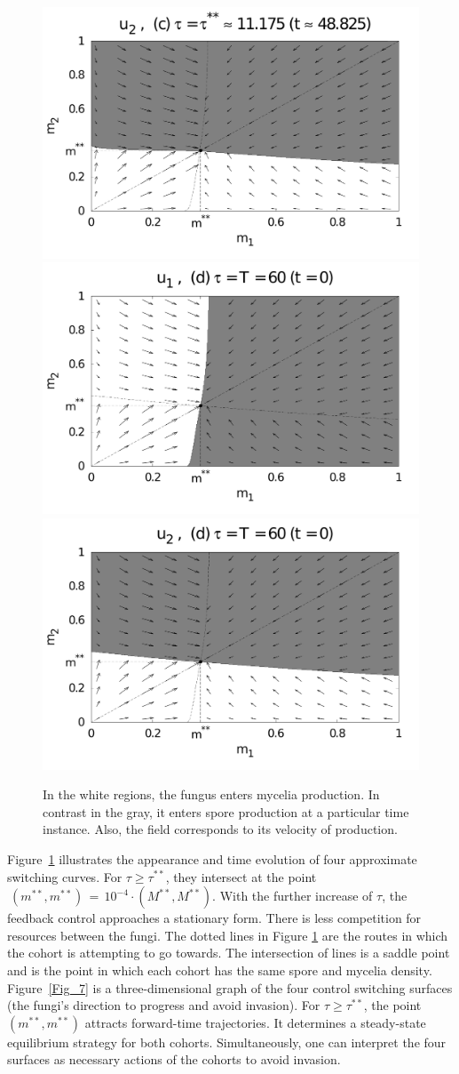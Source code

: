 \documentclass[11pt]{amsart}
\begin{document}
\begin{figure}
{\includegraphics[width = 0.48 \textwidth]{figures/Figure_5c_2.pdf} \\
\includegraphics[width = 0.48 \textwidth]{figures/Figure_5d_1.pdf}
\includegraphics[width = 0.48 \textwidth]{figures/Figure_5d_2.pdf}
}
\bf \caption{In the white regions, the fungus enters mycelia production. In contrast in the gray, it enters spore production at a particular time instance. Also, the field corresponds to its velocity of production. }
\label{Fig_5}
\end{figure}

Figure~\ref{Fig_5} illustrates the appearance and time evolution of four
approximate switching curves. For $ \tau \geqslant \tau^{**} $, they intersect
at the point~$ \: \left( m^{**}, m^{**} \right) \, = \, 10^{-4}
\cdot \left( M^{**}, M^{**} \right) $. With the further increase of $ \tau $, the 
feedback control approaches a stationary form. There is less competition for resources between the fungi. The dotted lines in Figure \ref{Fig_5} are the routes in which the cohort is attempting to go towards. The intersection of lines is a saddle point and is the point in which each cohort has the same spore and mycelia density. Figure~\ref{Fig_7}
is a three-dimensional graph of the 
four control switching surfaces (the fungi's direction to progress and avoid invasion). 
For $ \tau \geqslant \tau^{**} $, the point~$ \left( m^{**}, m^{**} \right) $
attracts forward-time trajectories. It determines a steady-state equilibrium
strategy for both cohorts. Simultaneously, one can interpret the four surfaces as necessary actions of the cohorts to avoid invasion.
\end{document}

